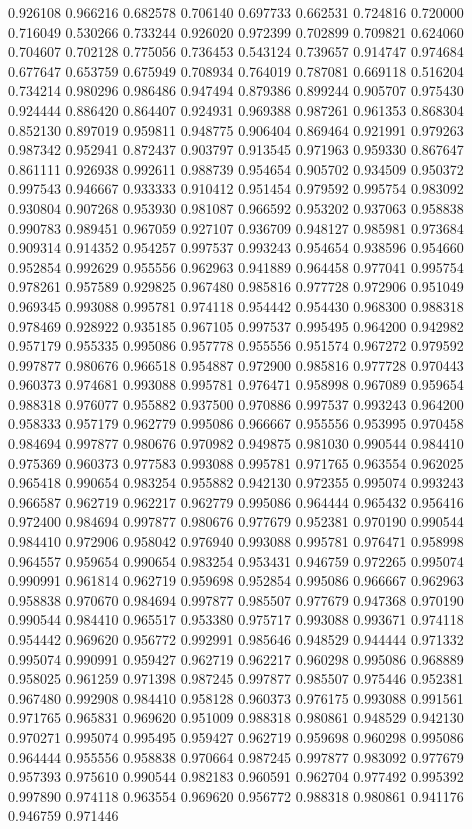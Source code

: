 0.926108
0.966216
0.682578
0.706140
0.697733
0.662531
0.724816
0.720000
0.716049
0.530266
0.733244
0.926020
0.972399
0.702899
0.709821
0.624060
0.704607
0.702128
0.775056
0.736453
0.543124
0.739657
0.914747
0.974684
0.677647
0.653759
0.675949
0.708934
0.764019
0.787081
0.669118
0.516204
0.734214
0.980296
0.986486
0.947494
0.879386
0.899244
0.905707
0.975430
0.924444
0.886420
0.864407
0.924931
0.969388
0.987261
0.961353
0.868304
0.852130
0.897019
0.959811
0.948775
0.906404
0.869464
0.921991
0.979263
0.987342
0.952941
0.872437
0.903797
0.913545
0.971963
0.959330
0.867647
0.861111
0.926938
0.992611
0.988739
0.954654
0.905702
0.934509
0.950372
0.997543
0.946667
0.933333
0.910412
0.951454
0.979592
0.995754
0.983092
0.930804
0.907268
0.953930
0.981087
0.966592
0.953202
0.937063
0.958838
0.990783
0.989451
0.967059
0.927107
0.936709
0.948127
0.985981
0.973684
0.909314
0.914352
0.954257
0.997537
0.993243
0.954654
0.938596
0.954660
0.952854
0.992629
0.955556
0.962963
0.941889
0.964458
0.977041
0.995754
0.978261
0.957589
0.929825
0.967480
0.985816
0.977728
0.972906
0.951049
0.969345
0.993088
0.995781
0.974118
0.954442
0.954430
0.968300
0.988318
0.978469
0.928922
0.935185
0.967105
0.997537
0.995495
0.964200
0.942982
0.957179
0.955335
0.995086
0.957778
0.955556
0.951574
0.967272
0.979592
0.997877
0.980676
0.966518
0.954887
0.972900
0.985816
0.977728
0.970443
0.960373
0.974681
0.993088
0.995781
0.976471
0.958998
0.967089
0.959654
0.988318
0.976077
0.955882
0.937500
0.970886
0.997537
0.993243
0.964200
0.958333
0.957179
0.962779
0.995086
0.966667
0.955556
0.953995
0.970458
0.984694
0.997877
0.980676
0.970982
0.949875
0.981030
0.990544
0.984410
0.975369
0.960373
0.977583
0.993088
0.995781
0.971765
0.963554
0.962025
0.965418
0.990654
0.983254
0.955882
0.942130
0.972355
0.995074
0.993243
0.966587
0.962719
0.962217
0.962779
0.995086
0.964444
0.965432
0.956416
0.972400
0.984694
0.997877
0.980676
0.977679
0.952381
0.970190
0.990544
0.984410
0.972906
0.958042
0.976940
0.993088
0.995781
0.976471
0.958998
0.964557
0.959654
0.990654
0.983254
0.953431
0.946759
0.972265
0.995074
0.990991
0.961814
0.962719
0.959698
0.952854
0.995086
0.966667
0.962963
0.958838
0.970670
0.984694
0.997877
0.985507
0.977679
0.947368
0.970190
0.990544
0.984410
0.965517
0.953380
0.975717
0.993088
0.993671
0.974118
0.954442
0.969620
0.956772
0.992991
0.985646
0.948529
0.944444
0.971332
0.995074
0.990991
0.959427
0.962719
0.962217
0.960298
0.995086
0.968889
0.958025
0.961259
0.971398
0.987245
0.997877
0.985507
0.975446
0.952381
0.967480
0.992908
0.984410
0.958128
0.960373
0.976175
0.993088
0.991561
0.971765
0.965831
0.969620
0.951009
0.988318
0.980861
0.948529
0.942130
0.970271
0.995074
0.995495
0.959427
0.962719
0.959698
0.960298
0.995086
0.964444
0.955556
0.958838
0.970664
0.987245
0.997877
0.983092
0.977679
0.957393
0.975610
0.990544
0.982183
0.960591
0.962704
0.977492
0.995392
0.997890
0.974118
0.963554
0.969620
0.956772
0.988318
0.980861
0.941176
0.946759
0.971446
